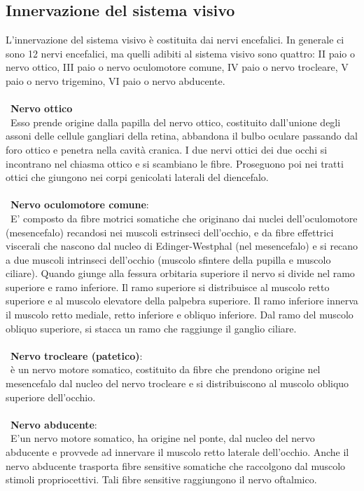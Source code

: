 \subsection{Innervazione del sistema visivo}

L’innervazione del sistema visivo è costituita dai nervi encefalici. In generale ci sono 12 nervi encefalici, ma quelli adibiti al sistema visivo sono quattro: II paio o nervo ottico, III paio o nervo oculomotore comune, IV paio o nervo trocleare, V paio o nervo trigemino, VI paio o nervo abducente.
\\\ \\\
\textbf{Nervo ottico}
\\\ 
Esso prende origine dalla papilla del nervo ottico, costituito dall’unione degli assoni delle cellule gangliari della retina, abbandona il bulbo oculare passando dal foro ottico e penetra nella cavità cranica. I due nervi ottici dei due occhi si incontrano nel chiasma ottico e si scambiano le fibre. Proseguono poi nei tratti ottici che giungono nei corpi genicolati laterali del diencefalo.
\\\ \\\
\textbf{Nervo oculomotore comune}: 
\\\ E' composto da fibre motrici somatiche che originano dai nuclei dell’oculomotore (mesencefalo) recandosi nei muscoli estrinseci dell’occhio, e da fibre effettrici 	viscerali che nascono dal nucleo di Edinger-Westphal (nel mesencefalo) e si recano a due muscoli intrinseci dell’occhio (muscolo sfintere della pupilla e muscolo ciliare). Quando giunge alla fessura orbitaria superiore il nervo si divide nel ramo superiore e ramo inferiore. Il ramo superiore si distribuisce al muscolo retto superiore e al muscolo elevatore della palpebra superiore. Il ramo inferiore innerva il muscolo retto mediale, retto inferiore e obliquo inferiore. Dal ramo del muscolo obliquo superiore, si stacca un ramo che raggiunge il ganglio ciliare.
\\\ \\\
\textbf{Nervo trocleare (patetico)}: 
\\\
è un nervo motore somatico, costituito da fibre che prendono origine nel mesencefalo dal nucleo del nervo trocleare e si distribuiscono al muscolo obliquo superiore dell’occhio.
\\\ \\\
\textbf{Nervo abducente}: 
\\\ E'un nervo motore somatico, ha origine nel ponte, dal nucleo del nervo abducente e provvede ad innervare il muscolo retto laterale dell’occhio. Anche il nervo abducente trasporta fibre sensitive somatiche che raccolgono dal muscolo stimoli propriocettivi. Tali fibre sensitive raggiungono il nervo oftalmico.

